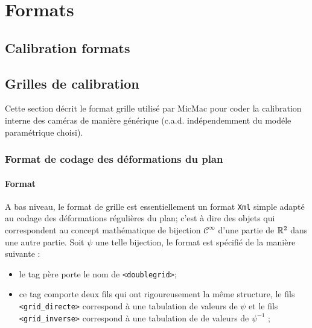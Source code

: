 \chapter{Formats}


\section{Calibration formats}

\label{FORM:CALIB}

\section{Grilles de calibration}
\label{Format:Grille}

Cette section d\'ecrit le format grille utilis\'e par MicMac pour
coder  la calibration interne des cam\'eras 
de mani\`ere g\'en\'erique (c.a.d. ind\'ependemment du mod\'ele
param\'etrique choisi).

\subsection{Format de codage des d\'eformations du plan }

\subsubsection{Format}

A bas niveau, le format de grille est essentiellement un format {\tt Xml}  simple
adapt\'e au codage des d\'eformations r\'eguli\`eres du plan;
c'est \`a dire des objets qui correspondent au concept math\'ematique
de bijection  $\mathcal{C}^\infty$ d'une partie de $\RR^2$ dans une
autre partie. Soit $\psi$ une telle bijection, le format est sp\'ecifi\'e
de la mani\`ere suivante :

\begin{itemize}
   \item le tag p\`ere porte le nom de {\tt  <doublegrid>};
   \item ce tag comporte deux fils qui ont rigoureusement la m\^eme structure,
         le fils  {\tt <grid\_directe>} correspond \`a une tabulation 
         de valeurs de $\psi$ et le fils  {\tt <grid\_inverse>} 
         correspond \`a une tabulation de  de valeurs de $\psi^{-1}$ ;
\end{itemize}

